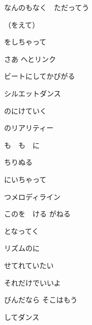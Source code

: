 \documentclass[a4paper,tate,twocolumn,12pt]{ltjtarticle}
\begin{document}
\begin{flushleft}
\begin{minipage}{\linewidth}
なんのもなく　ただってう

（をえて）

をしちゃって

さあ へとリンク

ビートにしてかびがる


シルエットダンス
\end{minipage}

\vspace{2em}

\noindent\begin{minipage}{\linewidth}
のにけていく

のリアリティー

も　も　に

ちりぬる
\end{minipage}

\vspace{2em}

\noindent\begin{minipage}{\linewidth}
にいちゃって

つメロディライン

このを　ける がねる
\end{minipage}

\vspace{2em}

\noindent\begin{minipage}{\linewidth}
となってく

リズムのに

せてれていたい

それだけでいいよ
\end{minipage}

\vspace{2em}

\noindent\begin{minipage}{\linewidth}
びんだなら そこはもう

 してダンス


\end{minipage}
\end{flushleft}
\end{document}
